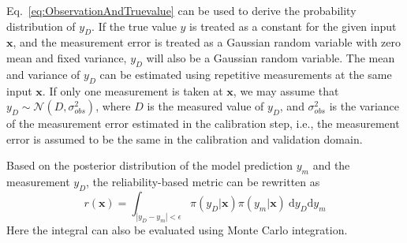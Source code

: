 \documentclass[preprint,review,12pt,3p]{elsarticle}
\begin{document}
Eq.~\ref{eq:ObservationAndTruevalue} can be used to derive the probability distribution of $y_D$. If the true value $y$ is treated as a constant for the given input $\boldsymbol{x}$, and the measurement error is treated as a Gaussian random variable with zero mean and fixed variance, $y_D$ will also be a Gaussian random variable. The mean and variance of $y_D$ can be estimated using repetitive measurements at the same input $\boldsymbol{x}$. If only one measurement is taken at $\boldsymbol{x}$, we may assume that $y_D \sim \mathcal{N}(D,\sigma_{obs}^2)$, where $D$ is the measured value of $y_D$, and $\sigma_{obs}^2$ is the variance of the measurement error estimated in the calibration step, i.e., the measurement error is assumed to be the same in the calibration and validation domain.

Based on the posterior distribution of the model prediction $y_m$ and the measurement $y_D$, the reliability-based metric can be rewritten as
\begin{equation}
r(\boldsymbol{x}) = \int_{|y_D-y_m|<\epsilon} \pi(y_D|\boldsymbol{x})  \pi(y_m|\boldsymbol{x}) \ \mathrm{d}y_D \mathrm{d}y_m
\end{equation}
Here the integral can also be evaluated using Monte Carlo integration.
\end{document}
